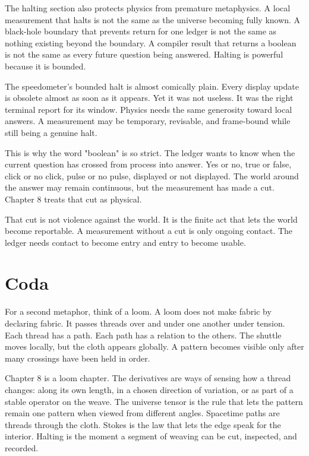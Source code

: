 The halting section also protects physics from premature metaphysics. A local
measurement that halts is not the same as the universe becoming fully known. A
black-hole boundary that prevents return for one ledger is not the same as
nothing existing beyond the boundary. A compiler result that returns a boolean
is not the same as every future question being answered. Halting is powerful
because it is bounded.

The speedometer's bounded halt is almost comically plain. Every display update
is obsolete almost as soon as it appears. Yet it was not useless. It was the
right terminal report for its window. Physics needs the same generosity toward
local answers. A measurement may be temporary, revisable, and frame-bound while
still being a genuine halt.

This is why the word "boolean" is so strict. The ledger wants to know when the
current question has crossed from process into answer. Yes or no, true or
false, click or no click, pulse or no pulse, displayed or not displayed. The
world around the answer may remain continuous, but the measurement has made a
cut. Chapter 8 treats that cut as physical.

That cut is not violence against the world. It is the finite act that lets the
world become reportable. A measurement without a cut is only ongoing contact.
The ledger needs contact to become entry and entry to become usable.

\section*{Coda}

For a second metaphor, think of a loom. A loom does not make fabric by
declaring fabric. It passes threads over and under one another under tension.
Each thread has a path. Each path has a relation to the others. The shuttle
moves locally, but the cloth appears globally. A pattern becomes visible only
after many crossings have been held in order.

Chapter 8 is a loom chapter. The derivatives are ways of sensing how a thread
changes: along its own length, in a chosen direction of variation, or as part
of a stable operator on the weave. The universe tensor is the rule that lets
the pattern remain one pattern when viewed from different angles. Spacetime
paths are threads through the cloth. Stokes is the law that lets the edge speak
for the interior. Halting is the moment a segment of weaving can be cut,
inspected, and recorded.

